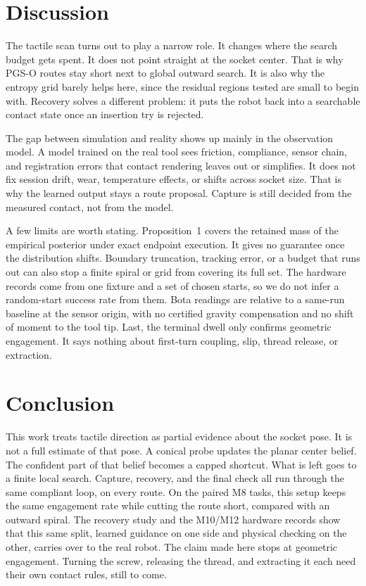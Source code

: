 \documentclass[letterpaper,10 pt,conference]{ieeeconf}
\newcommand{\pgso}{\textsc{PGS-O}}
\begin{document}
\clearpage
\twocolumn
\section{Discussion}

The tactile scan turns out to play a narrow role.  It changes where the
search budget gets spent.  It does not point straight at the socket center.
That is why \pgso{} routes stay short next to global outward search.  It is
also why the entropy grid barely helps here, since the residual regions
tested are small to begin with.  Recovery solves a different problem: it
puts the robot back into a searchable contact state once an insertion try
is rejected.

The gap between simulation and reality shows up mainly in the observation
model.  A model trained on the real tool sees friction, compliance, sensor
chain, and registration errors that contact rendering leaves out or
simplifies.  It does not fix session drift, wear, temperature effects, or
shifts across socket size.  That is why the learned output stays a route
proposal.  Capture is still decided from the measured contact, not from the
model.

A few limits are worth stating.  Proposition~1 covers the retained mass of
the empirical posterior under exact endpoint execution.  It gives no
guarantee once the distribution shifts.  Boundary truncation, tracking
error, or a budget that runs out can also stop a finite spiral or grid from
covering its full set.  The hardware records come from one fixture and a
set of chosen starts, so we do not infer a random-start success rate from
them.  Bota readings are relative to a same-run baseline at the sensor
origin, with no certified gravity compensation and no shift of moment to
the tool tip.  Last, the terminal dwell only confirms geometric engagement.
It says nothing about first-turn coupling, slip, thread release, or
extraction.

\section{Conclusion}

This work treats tactile direction as partial evidence about the socket
pose.  It is not a full estimate of that pose.  A conical probe updates the
planar center belief.  The confident part of that belief becomes a capped
shortcut.  What is left goes to a finite local search.  Capture, recovery,
and the final check all run through the same compliant loop, on every
route.  On the paired M8 tasks, this setup keeps the same engagement rate
while cutting the route short, compared with an outward spiral.  The
recovery study and the M10/M12 hardware records show that this same split,
learned guidance on one side and physical checking on the other, carries
over to the real robot.  The claim made here stops at geometric
engagement.  Turning the screw, releasing the thread, and extracting it
each need their own contact rules, still to come.



\end{document}
